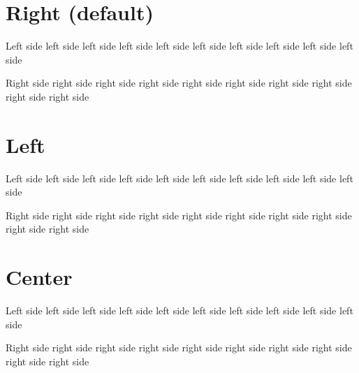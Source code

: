 \documentclass{book}
\begin{document}
\section{Right (default)}

\begin{pairs}

\begin{Leftside}
\beginnumbering
\pstart
Left side left side left side left side left side left side left side left side left side left side 
\pend
\endnumbering
\end{Leftside}

\begin{Rightside}
\beginnumbering
\pstart
Right side right side right side right side right side right side right side right side right side right side 
\pend
\endnumbering
\end{Rightside}

\Columns
\end{pairs}

\section{Left}

\begin{pairs}

\begin{Leftside}
\beginnumbering
\pstart
Left side left side left side left side left side left side left side left side left side left side 
\pend
\endnumbering
\end{Leftside}

\begin{Rightside}
\beginnumbering
\pstart
Right side right side right side right side right side right side right side right side right side right side 
\pend
\endnumbering
\end{Rightside}

\Columns
\end{pairs}

\section{Center}

\begin{pairs}

\begin{Leftside}
\beginnumbering
\pstart
Left side left side left side left side left side left side left side left side left side left side 
\pend
\endnumbering
\end{Leftside}

\begin{Rightside}
\beginnumbering
\pstart
Right side right side right side right side right side right side right side right side right side right side 
\pend
\endnumbering
\end{Rightside}

\Columns
\end{pairs}
\end{document}
